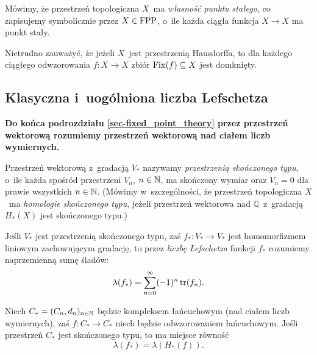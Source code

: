 Mówimy, że przestrzeń topologiczna $X$~ma \textit{własność punktu stałego}, co zapisujemy symbolicznie przez $X\in \mathrm{FPP}$, o~ile każda ciągła funkcja $X\to X$ ma punkt stały.

Nietrudno zauważyć, że jeżeli $X$~jest przestrzenią Hausdorffa, to dla każdego ciągłego odwzorowania $f\colon X\to X$ zbiór $\operatorname{Fix}(f)\subseteq X$ jest domknięty.






\subsection{Klasyczna i~uogólniona liczba Lefschetza}
\textbf{Do końca podrozdziału \ref{sec-fixed_point_theory} przez przestrzeń wektorową rozumiemy przestrzeń wektorową nad 
ciałem liczb wymiernych.}

Przestrzeń wektorową z~gradacją $V_*$ nazywamy \textit{przestrzenią skończonego typu}, o~ile każda spośród przestrzeni $V_n$, $n\in\mathbb{N}$, ma skończony wymiar oraz $V_n=0$ dla prawie wszystkich $n\in\mathbb{N}$. (Mówimy w~szczególności, że przestrzeń topologiczna $X$~ma \textit{homologie skończonego typu}, jeżeli przestrzeń wektorowa nad $\mathbb{Q}$~z~gradacją $H_*(X)$ jest skończonego typu.)

Jeśli $V_*$ jest przestrzenią skończonego typu, zaś $f_*\colon V_*\to V_*$ jest homomorfizmem liniowym zachowującym gradację, to przez \textit{liczbę Lefschetza} funkcji $f_*$ rozumiemy naprzemienną sumę śladów: \[\lambda(f_*)=\sum_{n=0}^{\infty}(-1)^n\operatorname{tr}(f_n).\]

\begin{tw}\label{tw-lefschetza-hopfa}
Niech $C_*=(C_n,d_n)_{n\in\mathbb{N}}$ będzie kompleksem łańcuchowym (nad ciałem liczb wymiernych), zaś $f\colon C_*\to C_*$ niech będzie odwzorowaniem łańcuchowym. Jeśli przestrzeń $C_*$ jest skończonego typu, to ma miejsce równość \[\lambda(f_*)=\lambda(H_*(f)).\]
\end{tw}

